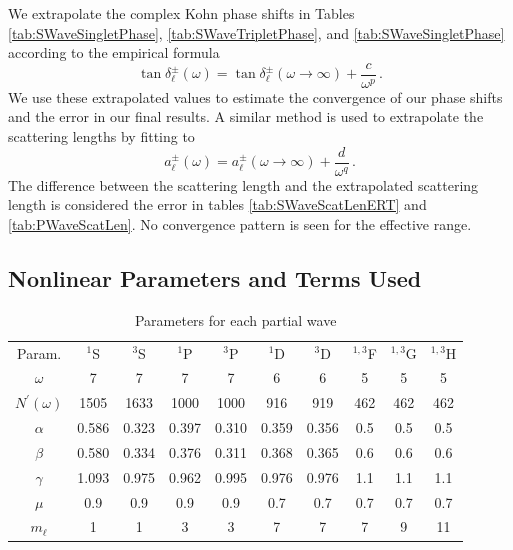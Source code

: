 \documentclass[preprint,showpacs,preprintnumbers,amsmath,amssymb,longbibliography,pra,aps]{revtex4-1}
\begin{document}
We extrapolate the complex Kohn phase shifts in Tables \ref{tab:SWaveSingletPhase}, \ref{tab:SWaveTripletPhase}, and \ref{tab:SWaveSingletPhase} according to the empirical formula \cite{VanReeth2003}
\begin{equation}
\label{eq:Extrap}
\tan\delta_\ell^\pm(\omega) = \tan\delta_\ell^\pm(\omega\to\infty) + \frac{c}{\omega^p}\, .
\end{equation}
We use these extrapolated values to estimate the convergence of our phase shifts and the error in our final results.
A similar method is used to extrapolate the scattering lengths by fitting to
\begin{equation}
\label{eq:ExtrapA}
a_\ell^\pm(\omega) = a_\ell^\pm(\omega\to\infty) + \frac{d}{\omega^q}\, .
\end{equation}
The difference between the scattering length and the extrapolated scattering length is considered the error in tables \ref{tab:SWaveScatLenERT} and \ref{tab:PWaveScatLen}. No convergence pattern is seen for the effective range.

\subsection{Nonlinear Parameters and Terms Used}
\label{sec:Parameters}

\begin{table}[H]
  \centering
	\begin{ruledtabular}
    \begin{tabular}{cccccccccc}
    Param. & $^1$S & $^3$S & $^1$P & $^3$P & $^1$D & $^3$D & $^{1,3}$F & $^{1,3}$G & $^{1,3}$H \\
    \colrule
	$\omega$           & 7     & 7     & 7     & 7     & 6     & 6     & 5    & 5   & 5 \\
	$N^\prime(\omega)$ & 1505  & 1633  & 1000  & 1000  & 916   & 919   & 462  & 462 & 462 \\
	$\alpha$           & 0.586 & 0.323 & 0.397 & 0.310 & 0.359 & 0.356 & 0.5  & 0.5 & 0.5 \\
	$\beta$            & 0.580 & 0.334 & 0.376 & 0.311 & 0.368 & 0.365 & 0.6  & 0.6 & 0.6 \\
	$\gamma$           & 1.093 & 0.975 & 0.962 & 0.995 & 0.976 & 0.976 & 1.1  & 1.1 & 1.1 \\
	$\mu$              & 0.9   & 0.9   & 0.9   & 0.9   & 0.7   & 0.7   & 0.7  & 0.7 & 0.7 \\
	$m_\ell$           & 1     & 1     & 3     & 3     & 7     & 7     & 7    & 9   & 11 \\
    \end{tabular}
  \end{ruledtabular}
  \caption{Parameters for each partial wave}
  \label{tab:Nonlinear}
\end{table}
\end{document}
